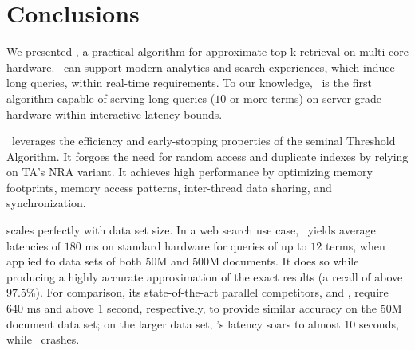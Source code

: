 \section{Conclusions}
\label{sec:conclusions}

We presented \alg, a practical algorithm for approximate top-k retrieval on multi-core hardware. 
\alg\ can support modern analytics and search experiences, which induce long queries, within real-time  requirements. 
To our knowledge, \alg\ is the first algorithm capable of serving  long queries ($10$ or more terms)
on server-grade hardware
within interactive latency bounds.



\alg\ leverages the efficiency and early-stopping properties of the seminal Threshold Algorithm. 
It forgoes the need for random access and duplicate indexes by relying on  TA's 
NRA variant. 
It achieves high performance by 
optimizing memory footprints, memory access patterns, inter-thread data sharing, and synchronization.  

\alg\/ scales perfectly with data set size. In a web search use case, \alg\ yields average latencies of  $180$ ms on standard hardware for queries of up to $12$ terms,  
when applied to data sets of both $50$M and $500$M documents. 
It does so while producing a highly accurate approximation of the exact results (a recall of above $97.5\%$). 
For comparison, its state-of-the-art parallel competitors, \pBMW\/ and \pJASS,  
require $640$ ms and above 1 second, respectively, to provide similar accuracy on the 50M document data set;
on the larger data set,  \pBMW's latency soars to almost 10 seconds, while \pJASS\ crashes. 


